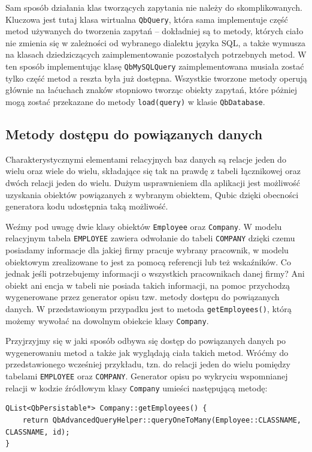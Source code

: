 \documentclass[12pt]{report}
\begin{document}
Sam sposób działania klas tworzących zapytania nie należy do skomplikowanych. Kluczowa jest tutaj klasa wirtualna {\tt QbQuery}, która sama implementuje część metod
używanych do tworzenia zapytań -- dokładniej są to metody, których ciało nie zmienia się w zależności od wybranego dialektu języka SQL, a także wymusza na klasach
dziedziczących zaimplementowanie pozostałych potrzebnych metod. W ten sposób implementując klasę {\tt QbMySQLQuery} zaimplementowana musiała zostać tylko część
metod a reszta była już dostępna. Wszystkie tworzone metody operują głównie na łaćuchach znaków stopniowo tworząc obiekty zapytań, które póżniej mogą zostać przekazane
do metody {\tt load(query)} w klasie {\tt QbDatabase}.

\subsection{Metody dostępu do powiązanych danych}

Charakterystycznymi elementami relacyjnych baz danych są relacje jeden do wielu oraz wiele do wielu, składające się tak na prawdę z tabeli łącznikowej oraz dwóch relacji
jeden do wielu. Dużym usprawnieniem dla aplikacji jest możliwość uzyskania obiektów powiązanych z wybranym obiektem, Qubic dzięki obecności generatora kodu udostępnia
taką możliwość.

Weźmy pod uwagę dwie klasy obiektów {\tt Employee} oraz {\tt Company}. W modelu relacyjnym tabela {\tt EMPLOYEE} zawiera odwołanie do tabeli {\tt COMPANY} dzięki
czemu posiadamy informacje dla jakiej firmy pracuje wybrany pracownik, w modelu obiektowym zrealizowane to jest za pomocą referencji lub też wskaźników. Co jednak jeśli
potrzebujemy informacji o wszystkich pracownikach danej firmy? Ani obiekt ani encja w tabeli nie posiada takich informacji, na pomoc przychodzą wygenerowane przez
generator opisu tzw. metody dostępu do powiązanych danych. W przedstawionym przypadku jest to metoda {\tt getEmployees()}, którą możemy wywołać na dowolnym obiekcie
klasy {\tt Company}.

Przyjrzyjmy się w jaki sposób odbywa się dostęp do powiązanych danych po wygenerowaniu metod a także jak wyglądają ciała takich metod. Wróćmy do przedstawionego
wcześniej przykładu, tzn. do relacji jeden do wielu pomiędzy tabelami {\tt EMPLOYEE} oraz {\tt COMPANY}. Generator opisu po wykryciu wspomnianej relacji w kodzie źródłowym
klasy {\tt Company} umieści następującą metodę:

\begin{lstlisting}[style=customc,caption=Ciało metody dostępu do powiązanych danych (jeden do wielu)]
QList<QbPersistable*> Company::getEmployees() {
    return QbAdvancedQueryHelper::queryOneToMany(Employee::CLASSNAME, CLASSNAME, id);
}
\end{lstlisting}
\end{document}
